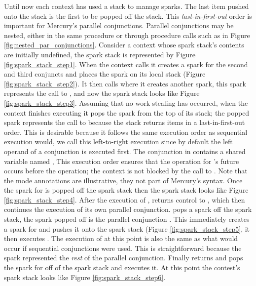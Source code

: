 Until now each context has used a stack to manage sparks.
The last item pushed onto the stack is the first to be popped off the
stack.
This \emph{last-in-first-out} order is important for Mercury's parallel
conjunctions.
Parallel conjunctions may be nested, either in the same procedure or through
procedure calls such as in Figure
\ref{fig:nested_par_conjunctions}.
Consider a context whose spark stack's contents are initially undefined,
the spark stack is represented by
Figure \ref{fig:spark_stack_step1}.
When the context calls  it creates a spark 
for the second and third conjuncts 
and places the spark on its local stack (Figure
\ref{fig:spark_stack_step2}).
It then calls  where it creates another spark,
this spark represents the call to ,
and now the spark stack looks like
Figure \ref{fig:spark_stack_step3}.
Assuming that no work stealing has occurred,
when the context finishes executing  it pops the spark from the top
of its stack;
the popped spark represents the call to  because
the stack returns items in a last-in-first-out order.
This is desirable because it follows the same execution order as sequential
execution would,
we call this left-to-right execution since by default the left operand of a
conjunction is executed first.
The conjunction in  contains a shared variable named ,
This execution order ensures that the \signal operation for 's future
occurs before the \wait operation;
the context is not blocked by the call to \wait.
Note that the mode annotations are illustrative,
they not part of Mercury's syntax.
Once the spark for  is popped off the spark stack then the spark
stack looks like Figure \ref{fig:spark_stack_step4}.
After the execution of ,  returns control to ,
which then continues the execution of its own parallel conjunction.
 pops a spark off the spark stack,
the spark popped off is the parallel conjunction
.
This immediately creates a spark for  and pushes it onto the spark
stack (Figure \ref{fig:spark_stack_step5},
it then executes .
The execution of  at this point is also the same as what would occur
if sequential conjunctions were used.
This is straightforward because
the spark represented the \emph{rest} of the parallel
conjunction.
Finally  returns and  pops the spark for  off of the
spark stack and executes it.
At this point the contest's spark stack looks like Figure
\ref{fig:spark_stack_step6}.

